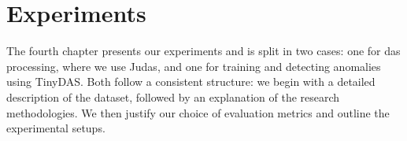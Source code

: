 \chapter{Experiments}
\label{chap:exp}

The fourth chapter presents our experiments and is split in two cases: one for \acrshort{das} processing, where we use Judas, and one for training and detecting anomalies using TinyDAS. Both follow a consistent structure: we begin with a detailed description of the dataset, followed by an explanation of the research methodologies. We then justify our choice of evaluation metrics and outline the experimental setups.


\clearpage


